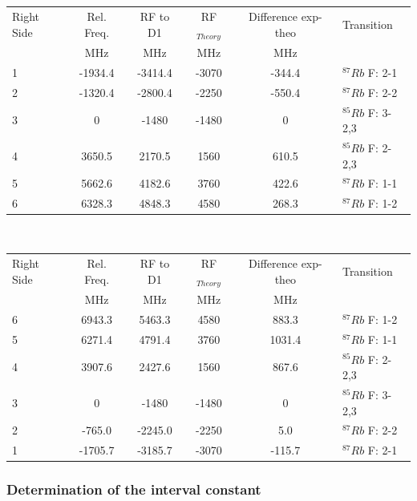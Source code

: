 


\begin{center}
\begin{tabular}[H]{l | c c c c l}
Right Side & Rel. Freq.\footnotemark[1] & RF to D1 & RF$_{Theory}$ & Difference exp-theo & Transition \\
 & MHz & MHz & MHz & MHz \\ \hline
1 & -1934.4 & -3414.4 & -3070 & -344.4 & $^{87}Rb$ F: 2-1 \\
2 & -1320.4 & -2800.4 & -2250 & -550.4 & $^{87}Rb$ F: 2-2 \\
3 &        0      & -1480 & -1480 & 0 & $^{85}Rb$ F: 3-2,3 \\
4 & 3650.5  & 2170.5 & 1560 & 610.5 & $^{85}Rb$ F: 2-2,3\\
5 & 5662.6  & 4182.6 & 3760 & 422.6 &$^{87}Rb$ F: 1-1\\
6 & 6328.3  & 4848.3 & 4580 & 268.3 & $^{87}Rb$ F: 1-2\\
\end{tabular}\\
\end{center}



\begin{center}
\begin{tabular}[H]{l | c c c c l}
Right Side & Rel. Freq.\footnotemark[1] & RF to D1 & RF$_{Theory}$ & Difference exp-theo & Transition \\
 & MHz & MHz & MHz & MHz \\ \hline
6 & 6943.3 & 5463.3 & 4580 & 883.3 & $^{87}Rb$ F: 1-2 \\
5 & 6271.4 & 4791.4 & 3760 & 1031.4 &$^{87}Rb$ F: 1-1 \\
4 & 3907.6 & 2427.6 & 1560 & 867.6 & $^{85}Rb$ F: 2-2,3\\
3 & 0 	  & -1480   & -1480 & 0 & $^{85}Rb$ F: 3-2,3 \\
2 & -765.0  & -2245.0& -2250 & 5.0 & $^{87}Rb$ F: 2-2 \\
1 & -1705.7& -3185.7& -3070 & -115.7 & $^{87}Rb$ F: 2-1 \\
\end{tabular}
\end{center}

\subsubsection{Determination of the interval constant}

